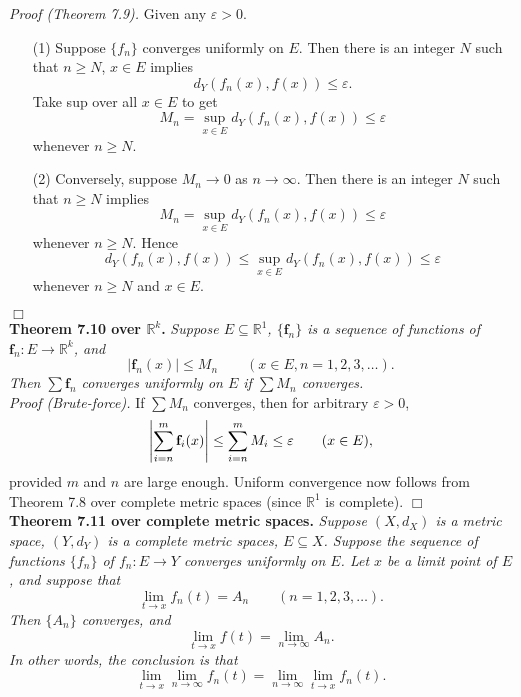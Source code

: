\documentclass{article}
\begin{document}
\emph{Proof (Theorem 7.9).}
Given any $\varepsilon > 0$.
\begin{enumerate}
  \item[(1)]
  Suppose $\{f_n\}$ converges uniformly on $E$.
  Then there is an integer $N$ such that $n \geq N$, $x \in E$ implies
  \[
    d_Y(f_n(x),f(x)) \leq \varepsilon.
  \]
  Take sup over all $x \in E$ to get
  \[
    M_n = \sup_{x \in E} d_Y(f_n(x),f(x)) \leq \varepsilon
  \]
  whenever $n \geq N$.

  \item[(2)]
  Conversely, suppose $M_n \to 0$ as $n \to \infty$.
  Then there is an integer $N$ such that $n \geq N$ implies
  \[
    M_n = \sup_{x \in E} d_Y(f_n(x),f(x)) \leq \varepsilon
  \]
  whenever $n \geq N$.
  Hence
  \[
    d_Y(f_n(x),f(x)) \leq \sup_{x \in E} d_Y(f_n(x),f(x)) \leq \varepsilon
  \]
  whenever $n \geq N$ and $x \in E$.
\end{enumerate}
$\Box$ \\



\textbf{Theorem 7.10 over $\mathbb{R}^k$.}
\emph{Suppose $E \subseteq \mathbb{R}^1$,
$\{\mathbf{f}_n\}$ is a sequence of functions of $\mathbf{f}_n: E \to \mathbb{R}^k$,
and
\[
  |\mathbf{f}_n(x)| \leq M_n
  \qquad
  (x \in E, n = 1,2,3,\ldots).
\]
Then $\sum \mathbf{f}_n$ converges uniformly on $E$ if $\sum M_n$ converges.} \\

\emph{Proof (Brute-force).}
If $\sum M_n$ converges, then for arbitrary $\varepsilon > 0$,
\[
  \abs{\sum_{i=n}^{m}\mathbf{f}_i(x)} \leq \sum_{i=n}^{m}M_i \leq \varepsilon
  \qquad
  (x \in E),
\]
provided $m$ and $n$ are large enough.
Uniform convergence now follows from Theorem 7.8 over complete metric spaces
(since $\mathbb{R}^1$ is complete).
$\Box$ \\



\textbf{Theorem 7.11 over complete metric spaces.}
\emph{Suppose $(X,d_X)$ is a metric space,
$(Y,d_Y)$ is a complete metric spaces, $E \subseteq X$.
Suppose the sequence of functions $\{f_n\}$ of $f_n: E \to Y$
converges uniformly on $E$.
Let $x$ be a limit point of $E$, and suppose that
\[
  \lim_{t \to x} f_n(t) = A_n
  \qquad
  (n=1,2,3,\ldots).
\]
Then $\{A_n\}$ converges, and
\[
  \lim_{t \to x}f(t) = \lim_{n \to \infty} A_n.
\]
In other words, the conclusion is that}
\[
  \lim_{t \to x} \lim_{n \to \infty} f_n(t)
  = \lim_{n \to \infty} \lim_{t \to x} f_n(t).
\]
\end{document}
